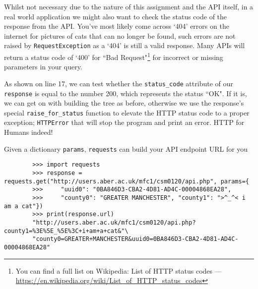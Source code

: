 \documentclass[a4paper]{article}
\begin{document}
Whilst not necessary due to the nature of this assignment and the API itself,
in a real world application we might also want to check
the status code of the response from the API. You've most likely come across `404' errors
on the internet for pictures of cats that can no longer be found, such errors are not raised
by \texttt{RequestException} as a `404' is still a valid response. Many APIs will return a status
code of `400' for ``Bad Request"\footnote{You can
find a full list on Wikipedia: List of HTTP status codes --- {\href{https://en.wikipedia.org/wiki/List\_of\_HTTP\_status\_codes}{https://en.wikipedia.org/wiki/List\_of\_HTTP\_status\_codes}}}
for incorrect or missing parameters in your query.

As shown on line 17, we can test whether the \texttt{status\_code} attribute of our
\texttt{response} is equal to the number 200, which represents the status ``OK".
If it is, we can get on with building the tree as before, otherwise we use the
response's special \texttt{raise\_for\_status} function to elevate the HTTP status
code to a proper exception; \texttt{HTTPError} that will stop the program and print
an error. HTTP for Humans indeed!
\begin{listing}[H]
    \caption[]{Given a dictionary \texttt{params}, \texttt{requests} can build your API endpoint URL for you}
    \label{list:requests_w_params}
    \begin{verbatim}
        >>> import requests
        >>> response = requests.get("http://users.aber.ac.uk/mfc1/csm0120/api.php", params={
        >>>     "uuid0": "0BA846D3-CBA2-4D81-AD4C-00004868EA28",
        >>>     "county0": "GREATER MANCHESTER", "county1": ">^_^< i am a cat"})
        >>> print(response.url)
        "http://users.aber.ac.uk/mfc1/csm0120/api.php?county1=%3E%5E_%5E%3C+i+am+a+cat&"\
        "county0=GREATER+MANCHESTER&uuid0=0BA846D3-CBA2-4D81-AD4C-00004868EA28"

    \end{verbatim}
\end{listing}
\end{document}
